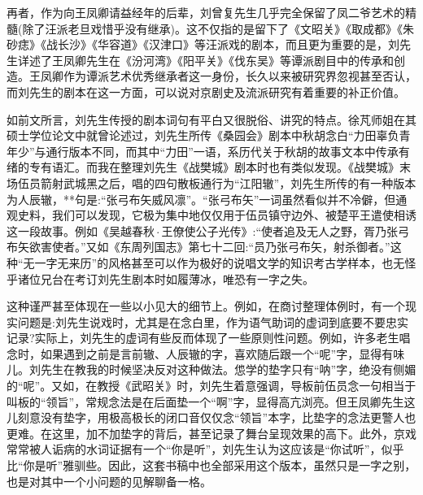 再者，作为向王凤卿请益经年的后辈，刘曾复先生几乎完全保留了凤二爷艺术的精髓(除了汪派老旦戏惜乎没有继承)。这不仅指的是留下了《文昭关》《取成都》《朱砂痣》《战长沙》《华容道》《汉津口》等汪派戏的剧本，而且更为重要的是，刘先生详述了王凤卿先生在《汾河湾》《阳平关》《伐东吴》等谭派剧目中的传承和创造。王凤卿作为谭派艺术优秀继承者这一身份，长久以来被研究界忽视甚至否认，而刘先生的剧本在这一方面，可以说对京剧史及流派研究有着重要的补正价值。

如前文所言，刘先生传授的剧本词句有平白又很脱俗、讲究的特点。徐芃师姐在其硕士学位论文中就曾论述过，刘先生所传《桑园会》剧本中秋胡念白``力田辜负青年少''与通行版本不同，而其中``力田''一语，系历代关于秋胡的故事文本中传承有绪的专有语汇。而我在整理刘先生《战樊城》剧本时也有类似发现。《战樊城》末场伍员箭射武城黑之后，唱的四句散板通行为``江阳辙''，刘先生所传的有一种版本为人辰辙，**句是:``张弓布矢威风凛''。``张弓布矢''一词虽然看似并不冷僻，但通观史料，我们可以发现，它极为集中地仅仅用于伍员镇守边外、被楚平王遣使相诱这一段故事。例如《吴越春秋$\!\cdot\!$王僚使公子光传》:``使者追及无人之野，胥乃张弓布矢欲害使者。''又如《东周列国志》第七十二回:``员乃张弓布矢，射杀御者。''这种``无一字无来历''的风格甚至可以作为极好的说唱文学的知识考古学样本，也无怪乎诸位兄台在考订刘先生剧本时如履薄冰，唯恐有一字之失。

这种谨严甚至体现在一些以小见大的细节上。例如，在商讨整理体例时，有一个现实问题是:刘先生说戏时，尤其是在念白里，作为语气助词的虚词到底要不要忠实记录?实际上，刘先生的虚词有些反而体现了一些原则性问题。例如，许多老生唱念时，如果遇到之前是言前辙、人辰辙的字，喜欢随后跟一个``呢''字，显得有味儿。刘先生在教我的时候坚决反对这种做法。怹学的垫字只有``呐''字，绝没有侧媚的``呢''。又如，在教授《武昭关》时，刘先生着意强调，导板前伍员念一句相当于叫板的``领旨''，常规念法是在后面垫一个``啊''字，显得高亢浏亮。但王凤卿先生这儿刻意没有垫字，用极高极长的闭口音仅仅念``领旨''本字，比垫字的念法更警人也更难。在这里，加不加垫字的背后，甚至记录了舞台呈现效果的高下。此外，京戏常常被人诟病的水词证据有一个``你是听''，刘先生认为这应该是``你试听''，似乎比``你是听''雅驯些。因此，这套书稿中也全部采用这个版本，虽然只是一字之别，也是对其中一个小问题的见解聊备一格。

